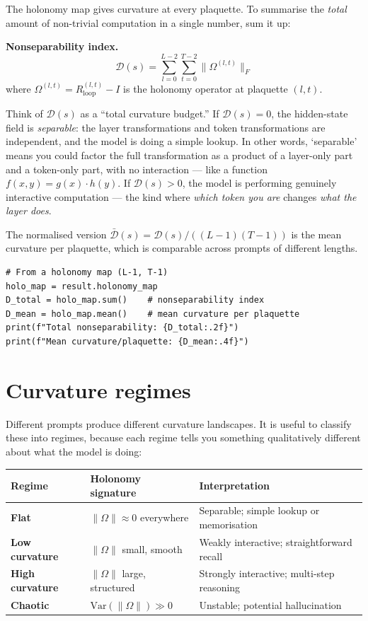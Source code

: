 \documentclass[11pt, twoside, openright]{memoir}
\begin{document}
The holonomy map gives curvature at every plaquette.  To summarise the
\emph{total} amount of non-trivial computation in a single number,
sum it up:

\begin{gabox}
\textbf{Nonseparability index.}
\[
  \mathcal{D}(s) = \sum_{l=0}^{L-2}\sum_{t=0}^{T-2}
    \|\Omega^{(l,t)}\|_F
\]
where $\Omega^{(l,t)} = R_{\mathrm{loop}}^{(l,t)} - I$ is the
holonomy operator at plaquette $(l, t)$.
\end{gabox}

Think of $\mathcal{D}(s)$ as a ``total curvature budget.''  If
$\mathcal{D}(s) = 0$, the hidden-state field is \emph{separable}: the
layer transformations and token transformations are independent, and the
model is doing a simple lookup.  In other words, `separable' means you could factor the full transformation as a product of a layer-only part and a token-only part, with no interaction --- like a function $f(x,y) = g(x) \cdot h(y)$.  If $\mathcal{D}(s) > 0$, the model is
performing genuinely interactive computation --- the kind where \emph{which
token you are} changes \emph{what the layer does}.

The normalised version $\bar{\mathcal{D}}(s) = \mathcal{D}(s) /
((L-1)(T-1))$ is the mean curvature per plaquette, which is comparable
across prompts of different lengths.

\begin{lstlisting}[caption={Computing the nonseparability index}]
# From a holonomy map (L-1, T-1)
holo_map = result.holonomy_map
D_total = holo_map.sum()    # nonseparability index
D_mean = holo_map.mean()    # mean curvature per plaquette
print(f"Total nonseparability: {D_total:.2f}")
print(f"Mean curvature/plaquette: {D_mean:.4f}")
\end{lstlisting}

\section{Curvature regimes}

Different prompts produce different curvature landscapes.  It is useful
to classify these into regimes, because each regime tells you something
qualitatively different about what the model is doing:

\begin{center}
\renewcommand{\arraystretch}{1.3}\small
\begin{tabular}{@{} l l l @{}}
\toprule
\textbf{Regime} & \textbf{Holonomy signature} & \textbf{Interpretation} \\
\midrule
\textbf{Flat} & $\|\Omega\| \approx 0$ everywhere
  & Separable; simple lookup or memorisation \\
\textbf{Low curvature} & $\|\Omega\|$ small, smooth
  & Weakly interactive; straightforward recall \\
\textbf{High curvature} & $\|\Omega\|$ large, structured
  & Strongly interactive; multi-step reasoning \\
\textbf{Chaotic} & $\mathrm{Var}(\|\Omega\|) \gg 0$
  & Unstable; potential hallucination \\
\bottomrule
\end{tabular}
\end{center}
\end{document}
